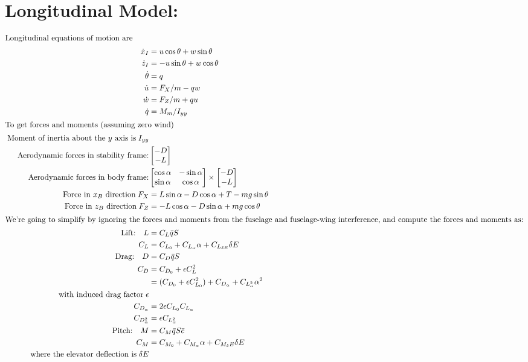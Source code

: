 \documentclass{article}
\begin{document}
\clearpage

\section{Longitudinal Model:}

\begin{align}
  \intertext{Longitudinal equations of motion are}\;
  \dot{x}_I &= u \cos \theta + w \sin \theta \\
  \dot{z}_I &= -u \sin \theta + w \cos \theta \\
  \dot{\theta} &= q \\
  \dot{u} &= F_X/m - qw \\
  \dot{w} &= F_Z/m + qu \\
  \dot{q} &= M_m/I_{yy} \\
  \intertext{To get forces and moments (assuming zero wind)}\;
  \textrm{Moment of inertia about the $y$ axis is}\;I_{yy} & \\
  \textrm{Aerodynamic forces in stability frame:} & \begin{bmatrix} -D \\ -L \end{bmatrix}\\
  \textrm{Aerodynamic forces in body frame:} & \begin{bmatrix} \cos \alpha & -\sin \alpha \\ 
    \sin \alpha & \cos \alpha \end{bmatrix} \times 
    \begin{bmatrix} -D \\ -L \end{bmatrix}\\
  \textrm{Force in $x_B$ direction}\;F_X &= L \sin \alpha -D \cos \alpha + T -
  mg \sin \theta \\
  \textrm{Force in $z_B$ direction}\;F_Z &= - L \cos \alpha - D \sin \alpha + mg \cos \theta\\
  \intertext{We're going to simplify by ignoring the forces and moments from
    the fuselage and fuselage-wing interference, and compute the forces and
    moments as:}
  \textrm{Lift:}\quad  L&=C_L\bar{q}S \\
  C_L &= C_{L_0} + C_{L_\alpha} \alpha + C_{L_{\delta E}} \delta E\\
  \textrm{Drag:}\quad    D &= C_D\bar{q}S\\
  C_D &= C_{D_0} + \epsilon C_L^2 \\
  &= (C_{D_0}+\epsilon C^2_{L_0}) + C_{D_\alpha} + C_{L_\alpha^2}\alpha^2\\
  \textrm{with induced drag factor} \; \epsilon \\
  C_{D_\alpha} &= 2 \epsilon C_{L_0} C_{L_\alpha} \\
  C_{D_\alpha^2} &= \epsilon C_{L_\alpha^2} \\
  \textrm{Pitch:} \quad M &= C_M\bar{q}S \bar{c}\\
  C_M &= C_{M_0} + C_{M_\alpha} \alpha + C_{M_\delta E} \delta E \\
  \textrm{where the elevator deflection is}\;\delta E
\end{align} 
\end{document}
